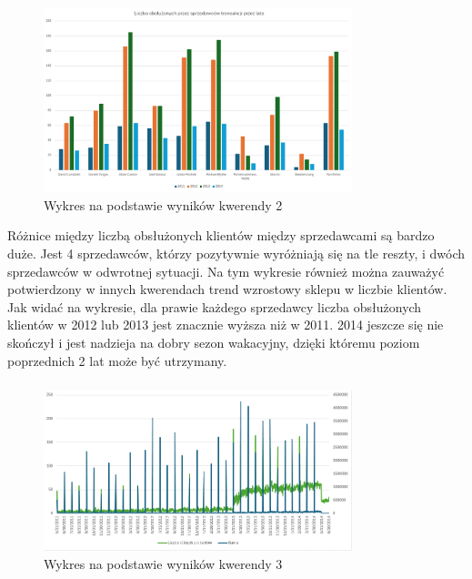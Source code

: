\documentclass[a4paper,12pt]{article}
\begin{document}
\subsubsection{}

\begin{figure}[H]
    \centering
    \includegraphics[width=0.8\textwidth]{images/excel/02.png}
    \caption{Wykres na podstawie wyników kwerendy 2}
\end{figure}

Różnice między liczbą obsłużonych klientów między sprzedawcami są bardzo duże. Jest 4 sprzedawców, którzy pozytywnie wyróżniają się na tle reszty, i dwóch sprzedawców w odwrotnej sytuacji. Na tym wykresie również można zauważyć potwierdzony w innych kwerendach trend wzrostowy sklepu w liczbie klientów. Jak widać na wykresie, dla prawie każdego sprzedawcy liczba obsłużonych klientów w 2012 lub 2013 jest znacznie wyższa niż w 2011. 2014 jeszcze się nie skończył i jest nadzieja na dobry sezon wakacyjny, dzięki któremu poziom poprzednich 2 lat może być utrzymany. 

\subsubsection{}

\begin{figure}[H]
    \centering
    \includegraphics[width=0.8\textwidth]{images/excel/03.png}
    \caption{Wykres na podstawie wyników kwerendy 3}
\end{figure}
\end{document}
